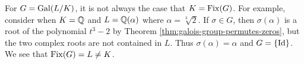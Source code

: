 \begin{example}
    For $G = \operatorname{Gal}(L/K)$, it is not always the case that $K = \operatorname{Fix}(G)$. For example, consider when $K = \mathbb Q$ and $L = \mathbb Q (\alpha)$ where $\alpha = \sqrt[3]{2}$. If $\sigma \in G$, then $\sigma(\alpha)$ is a root of the polynomial $t^3 - 2$ by Theorem \ref{thm:galois-group-permutes-zeros}, but the two complex roots are not contained in $L$. Thus $\sigma(\alpha) = \alpha$ and $G = \{ \operatorname{Id} \}$. We see that $\operatorname{Fix}(G) = L \neq K$. 
\end{example}



